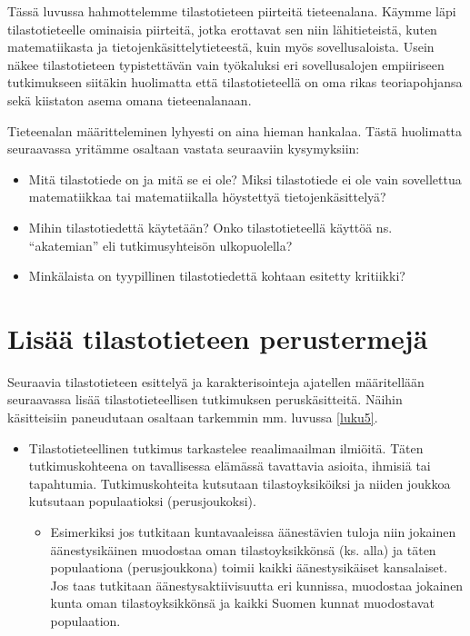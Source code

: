 \documentclass[
]{book}
\providecommand{\tightlist}{%
  \setlength{\itemsep}{0pt}\setlength{\parskip}{0pt}}
\begin{document}
Tässä luvussa hahmottelemme tilastotieteen piirteitä tieteenalana. Käymme läpi tilastotieteelle ominaisia piirteitä, jotka erottavat sen niin lähitieteistä, kuten matematiikasta ja tietojenkäsittelytieteestä, kuin myös sovellusaloista. Usein näkee tilastotieteen typistettävän vain työkaluksi eri sovellusalojen empiiriseen tutkimukseen siitäkin huolimatta että tilastotieteellä on oma rikas teoriapohjansa sekä kiistaton asema omana tieteenalanaan.

Tieteenalan määritteleminen lyhyesti on aina hieman hankalaa. Tästä huolimatta seuraavassa yritämme osaltaan vastata seuraaviin kysymyksiin:

\begin{itemize}
\tightlist
\item
  Mitä tilastotiede on ja mitä se ei ole? Miksi tilastotiede ei ole vain sovellettua matematiikkaa tai matematiikalla höystettyä tietojenkäsittelyä?
\item
  Mihin tilastotiedettä käytetään? Onko tilastotieteellä käyttöä ns. ``akatemian'' eli tutkimusyhteisön ulkopuolella?
\item
  Minkälaista on tyypillinen tilastotiedettä kohtaan esitetty kritiikki?
\end{itemize}

\hypertarget{alaluku31}{%
\section{Lisää tilastotieteen perustermejä}\label{alaluku31}}

Seuraavia tilastotieteen esittelyä ja karakterisointeja ajatellen määritellään seuraavassa lisää tilastotieteellisen tutkimuksen peruskäsitteitä. Näihin käsitteisiin paneudutaan osaltaan tarkemmin mm. luvussa \ref{luku5}.

\begin{itemize}
\tightlist
\item
  Tilastotieteellinen tutkimus tarkastelee reaalimaailman ilmiöitä. Täten tutkimuskohteena on tavallisessa elämässä tavattavia asioita, ihmisiä tai tapahtumia. Tutkimuskohteita kutsutaan tilastoyksiköiksi ja niiden joukkoa kutsutaan populaatioksi (perusjoukoksi).

  \begin{itemize}
  \tightlist
  \item
    Esimerkiksi jos tutkitaan kuntavaaleissa äänestävien tuloja niin jokainen äänestysikäinen muodostaa oman tilastoyksikkönsä (ks. alla) ja täten populaationa (perusjoukkona) toimii kaikki äänestysikäiset kansalaiset. Jos taas tutkitaan äänestysaktiivisuutta eri kunnissa, muodostaa jokainen kunta oman tilastoyksikkönsä ja kaikki Suomen kunnat muodostavat populaation.
  \end{itemize}
\end{itemize}
\end{document}
